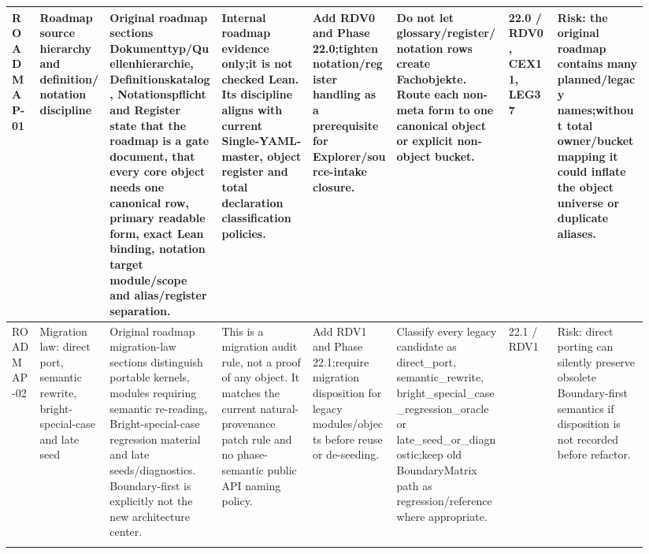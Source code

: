 \begin{longtable}{L{0.04\linewidth} L{0.105\linewidth} L{0.16\linewidth} L{0.13\linewidth} L{0.125\linewidth} L{0.165\linewidth} L{0.075\linewidth} L{0.135\linewidth}}
ROADMAP-01 & Roadmap source hierarchy and definition/\allowbreak{}notation discipline & Original roadmap sections Dokumenttyp/\allowbreak{}Quellenhierarchie, Definitionskatalog, Notationspflicht and Register state that the roadmap is a gate document, that every core object needs one canonical row, primary readable form, exact Lean binding, notation target module/\allowbreak{}scope and alias/\allowbreak{}register separation. & Internal roadmap evidence only;\newline it is not checked Lean. Its discipline aligns with current Single-YAML-master, object register and total declaration classification policies. & Add RDV0 and Phase 22.0;\newline tighten notation/\allowbreak{}register handling as a prerequisite for Explorer/\allowbreak{}source-intake closure. & Do not let glossary/\allowbreak{}register/\allowbreak{}notation rows create Fachobjekte. Route each non-meta form to one canonical object or explicit non-object bucket. & 22.0 /\allowbreak{} RDV0, CEX11, LEG37 & Risk: the original roadmap contains many planned/\allowbreak{}legacy names;\newline without total owner/\allowbreak{}bucket mapping it could inflate the object universe or duplicate aliases.\\
\hline
\addlinespace[0.24em]
ROADMAP-02 & Migration law: direct port, semantic rewrite, bright-special-case and late seed & Original roadmap migration-law sections distinguish portable kernels, modules requiring semantic re-reading, Bright-special-case regression material and late seeds/\allowbreak{}diagnostics. Boundary-first is explicitly not the new architecture center. & This is a migration audit rule, not a proof of any object. It matches the current natural-provenance patch rule and no phase-semantic public API naming policy. & Add RDV1 and Phase 22.1;\newline require migration disposition for legacy modules/\allowbreak{}objects before reuse or de-seeding. & Classify every legacy candidate as direct\_port, semantic\_rewrite, bright\_special\_case\_regression\_oracle or late\_seed\_or\_diagnostic;\newline keep old BoundaryMatrix path as regression/\allowbreak{}reference where appropriate. & 22.1 /\allowbreak{} RDV1 & Risk: direct porting can silently preserve obsolete Boundary-first semantics if disposition is not recorded before refactor.\\
\hline
\addlinespace[0.24em]

\end{longtable}
